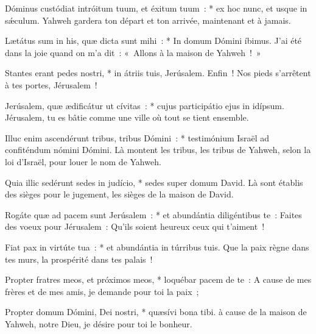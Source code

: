\begin{paracol}{2}
\LigneParacol
{Dóminus custódiat intróitum tuum, et éxitum tuum~: * ex hoc nunc, et usque in sǽculum.}
{Yahweh gardera ton départ et ton arrivée, maintenant et à jamais.}

\LigneParacol
{Lætátus sum in his, quæ dicta sunt mihi~: * In domum Dómini íbimus.}
{J'ai été dans la joie quand on m'a dit~: «~Allons à la maison de Yahweh~!~»}

\LigneParacol
{Stantes erant pedes nostri, * in átriis tuis, Jerúsalem.}
{Enfin~! Nos pieds s'arrêtent à tes portes, Jérusalem~!}

\LigneParacol
{Jerúsalem, quæ ædificátur ut cívitas~: * cujus participátio ejus in idípsum.}
{Jérusalem, tu es bâtie comme une ville où tout se tient ensemble.}

\LigneParacol
{Illuc enim ascendérunt tribus, tribus Dómini~: * testimónium Israël ad confiténdum nómini Dómini.}
{Là montent les tribus, les tribus de Yahweh, selon la loi d'Israël, pour louer le nom de Yahweh.}

\LigneParacol
{Quia illic sedérunt sedes in judício, * sedes super domum David.}
{Là sont établis des sièges pour le jugement, les sièges de la maison de David.}

\LigneParacol
{Rogáte quæ ad pacem sunt Jerúsalem~: * et abundántia diligéntibus te~:}
{Faites des voeux pour Jérusalem~: Qu'ils soient heureux ceux qui t'aiment~!}

\LigneParacol
{Fiat pax in virtúte tua~: * et abundántia in túrribus tuis.}
{Que la paix règne dans tes murs, la prospérité dans tes palais~!}

\LigneParacol
{Propter fratres meos, et próximos meos, * loquébar pacem de te~:}
{A cause de mes frères et de mes amis, je demande pour toi la paix~;}

\LigneParacol
{Propter domum Dómini, Dei nostri, * quæsívi bona tibi.}
{à cause de la maison de Yahweh, notre Dieu, je désire pour toi le bonheur. }

\end{paracol}
